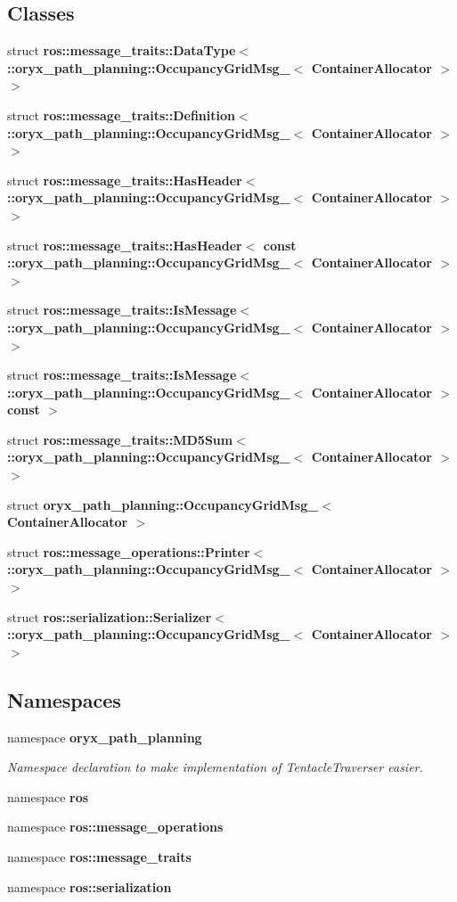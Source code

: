 \subsection*{\-Classes}
\begin{DoxyCompactItemize}
\item 
struct {\bf ros\-::message\-\_\-traits\-::\-Data\-Type$<$ \-::oryx\-\_\-path\-\_\-planning\-::\-Occupancy\-Grid\-Msg\-\_\-$<$ Container\-Allocator $>$ $>$}
\item 
struct {\bf ros\-::message\-\_\-traits\-::\-Definition$<$ \-::oryx\-\_\-path\-\_\-planning\-::\-Occupancy\-Grid\-Msg\-\_\-$<$ Container\-Allocator $>$ $>$}
\item 
struct {\bf ros\-::message\-\_\-traits\-::\-Has\-Header$<$ \-::oryx\-\_\-path\-\_\-planning\-::\-Occupancy\-Grid\-Msg\-\_\-$<$ Container\-Allocator $>$ $>$}
\item 
struct {\bf ros\-::message\-\_\-traits\-::\-Has\-Header$<$ const \-::oryx\-\_\-path\-\_\-planning\-::\-Occupancy\-Grid\-Msg\-\_\-$<$ Container\-Allocator $>$ $>$}
\item 
struct {\bf ros\-::message\-\_\-traits\-::\-Is\-Message$<$ \-::oryx\-\_\-path\-\_\-planning\-::\-Occupancy\-Grid\-Msg\-\_\-$<$ Container\-Allocator $>$ $>$}
\item 
struct {\bf ros\-::message\-\_\-traits\-::\-Is\-Message$<$ \-::oryx\-\_\-path\-\_\-planning\-::\-Occupancy\-Grid\-Msg\-\_\-$<$ Container\-Allocator $>$const  $>$}
\item 
struct {\bf ros\-::message\-\_\-traits\-::\-M\-D5\-Sum$<$ \-::oryx\-\_\-path\-\_\-planning\-::\-Occupancy\-Grid\-Msg\-\_\-$<$ Container\-Allocator $>$ $>$}
\item 
struct {\bf oryx\-\_\-path\-\_\-planning\-::\-Occupancy\-Grid\-Msg\-\_\-$<$ Container\-Allocator $>$}
\item 
struct {\bf ros\-::message\-\_\-operations\-::\-Printer$<$ \-::oryx\-\_\-path\-\_\-planning\-::\-Occupancy\-Grid\-Msg\-\_\-$<$ Container\-Allocator $>$ $>$}
\item 
struct {\bf ros\-::serialization\-::\-Serializer$<$ \-::oryx\-\_\-path\-\_\-planning\-::\-Occupancy\-Grid\-Msg\-\_\-$<$ Container\-Allocator $>$ $>$}
\end{DoxyCompactItemize}
\subsection*{\-Namespaces}
\begin{DoxyCompactItemize}
\item 
namespace {\bf oryx\-\_\-path\-\_\-planning}
\begin{DoxyCompactList}\small\item\em \-Namespace declaration to make implementation of \-Tentacle\-Traverser easier. \end{DoxyCompactList}\item 
namespace {\bf ros}
\item 
namespace {\bf ros\-::message\-\_\-operations}
\item 
namespace {\bf ros\-::message\-\_\-traits}
\item 
namespace {\bf ros\-::serialization}
\end{DoxyCompactItemize}

